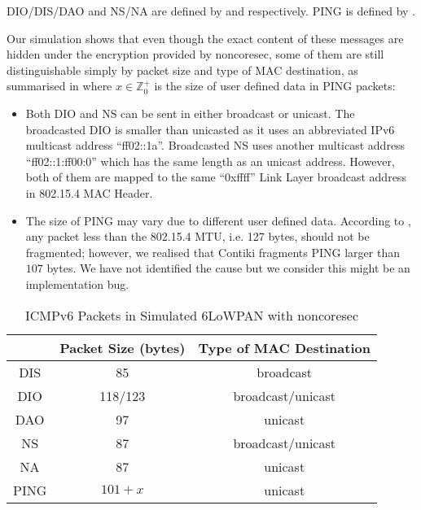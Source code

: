 DIO/DIS/DAO and NS/NA are defined by \cite{rfc6550} and \cite{rfc6775} respectively. PING is defined by \cite{rfc2463}.

Our simulation shows that even though the exact content of these messages are hidden under the encryption provided by noncoresec, some of them are still distinguishable simply by packet size and type of MAC destination, as summarised in  where $x \in \mathbb{Z}_{0}^{+}$ is the size of user defined data in PING packets:

\begin{itemize}
	\item Both DIO and NS can be sent in either broadcast or unicast. The broadcasted DIO is smaller than unicasted as it uses an abbreviated IPv6 multicast address ``ff02::1a''. Broadcasted NS uses another multicast address ``ff02::1:ff00:0'' which has the same length as an unicast address. However, both of them are mapped to the same ``0xffff'' Link Layer broadcast address in 802.15.4 MAC Header.
	\item The size of PING may vary due to different user defined data. According to \cite{rfc4944}, any packet less than the 802.15.4 MTU, i.e. 127 bytes, should not be fragmented; however, we realised that Contiki fragments PING larger than $107$ bytes. We have not identified the cause but we consider this might be an implementation bug.
\end{itemize}

\begin{table}[ht!]
	\center
	{
		\begin{tabular}{|c|c|c|}
			\hline
			       & Packet Size (bytes) & Type of MAC Destination \\ \hline
			DIS    & 85                  & broadcast                       \\ \hline
			DIO  & 118/123                 & broadcast/unicast                       \\ \hline
			DAO    & 97                  & unicast                      \\ \hline
			NS & 87                  & broadcast/unicast                       \\ \hline
			NA     & 87                  & unicast                      \\ \hline
			PING   & $101+x$               & unicast                      \\ \hline
		\end{tabular}
	}
	\caption{ICMPv6 Packets in Simulated 6LoWPAN with noncoresec}
	\label{ICMPPacketFeature}
\end{table}

